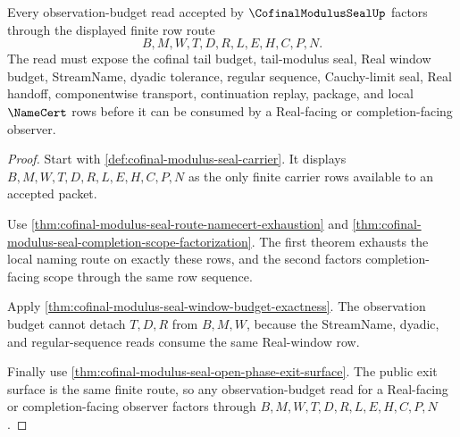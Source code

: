 \begin{theorem}
\label{thm:cofinal-modulus-seal-observation-budget-factorization}
Every observation-budget read accepted by $\CofinalModulusSealUp$ factors through the displayed finite row route
$$
B,M,W,T,D,R,L,E,H,C,P,N.
$$
The read must expose the cofinal tail budget, tail-modulus seal, Real window budget, StreamName, dyadic tolerance, regular sequence, Cauchy-limit seal, Real handoff, componentwise transport, continuation replay, package, and local $\NameCert$ rows before it can be consumed by a Real-facing or completion-facing observer.
\end{theorem}
\begin{proof}
Start with \autoref{def:cofinal-modulus-seal-carrier}. It displays $B,M,W,T,D,R,L,E,H,C,P,N$ as the only finite carrier rows available to an accepted packet.

Use \autoref{thm:cofinal-modulus-seal-route-namecert-exhaustion} and \autoref{thm:cofinal-modulus-seal-completion-scope-factorization}. The first theorem exhausts the local naming route on exactly these rows, and the second factors completion-facing scope through the same row sequence.

Apply \autoref{thm:cofinal-modulus-seal-window-budget-exactness}. The observation budget cannot detach $T,D,R$ from $B,M,W$, because the StreamName, dyadic, and regular-sequence reads consume the same Real-window row.

Finally use \autoref{thm:cofinal-modulus-seal-open-phase-exit-surface}. The public exit surface is the same finite route, so any observation-budget read for a Real-facing or completion-facing observer factors through $B,M,W,T,D,R,L,E,H,C,P,N$.
\end{proof}

